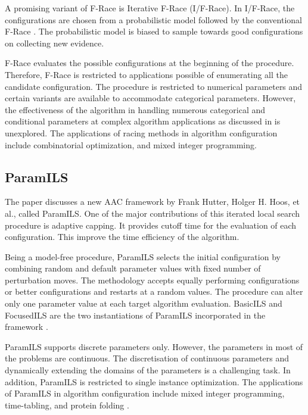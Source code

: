 A promising variant of F-Race is Iterative F-Race (I/F-Race). In I/F-Race, the configurations are chosen from a probabilistic model followed by the conventional F-Race \cite{IFRace_paper}. The probabilistic model is biased to sample towards good configurations on collecting new evidence.

F-Race evaluates the possible configurations at the beginning of the procedure. Therefore, F-Race is restricted to applications possible of enumerating all the candidate configuration. The procedure is restricted to numerical parameters and certain variants are available to accommodate categorical parameters. However, the effectiveness of the algorithm in handling numerous categorical and conditional parameters at complex algorithm applications as discussed in \cite{SAT_examplepaper} \cite{FRace_limitation2} \cite{FRace_limitation3} \cite{FRace_limitation4} is unexplored. The applications of racing methods in algorithm configuration include combinatorial optimization, and mixed integer programming.

\subsection{ParamILS}

The paper discusses a new AAC framework by Frank Hutter, Holger H. Hoos, et al., \cite{ParamILS_mainpaper} called ParamILS. One of the major contributions of this iterated local search procedure is adaptive capping. It provides cutoff time for the evaluation of each configuration. This improve the time efficiency of the algorithm.

Being a model-free procedure, ParamILS selects the initial configuration by combining random and default parameter values with fixed number of perturbation moves. The methodology accepts equally performing configurations or better configurations and restarts at a random values. The procedure can alter only one parameter value at each target algorithm evaluation. BasicILS and FocusedILS are the two instantiations of ParamILS incorporated in the framework \cite{ParamILS_mainpaper}.

ParamILS supports discrete parameters only. However, the parameters in most of the problems are continuous. The discretisation of continuous parameters and dynamically extending the domains of the parameters is a challenging task. In addition, ParamILS is restricted to single instance optimization. The applications of ParamILS in algorithm configuration include mixed integer programming, time-tabling, and protein folding \cite{ParamILS_mainpaper}.

